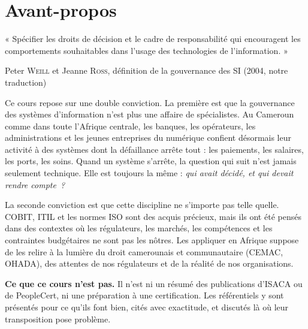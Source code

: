 
\chapter*{Avant-propos}

\epigraph{%
    « Spécifier les droits de décision et le cadre de responsabilité qui
    encouragent les comportements souhaitables dans l'usage des technologies
    de l'information. »%
}{Peter \textsc{Weill} et Jeanne \textsc{Ross}, définition de la
gouvernance des SI (2004, notre traduction)}

\vspace{0.5ex}

Ce cours repose sur une double conviction. La première est que la
gouvernance des systèmes d'information n'est plus une affaire de
spécialistes. Au Cameroun comme dans toute l'Afrique centrale, les banques,
les opérateurs, les administrations et les jeunes entreprises du numérique
confient désormais leur activité à des systèmes dont la défaillance arrête
tout : les paiements, les salaires, les ports, les soins. Quand un système
s'arrête, la question qui suit n'est jamais seulement technique. Elle est
toujours la même : \emph{qui avait décidé, et qui devait rendre compte~?}

La seconde conviction est que cette discipline ne s'importe pas telle
quelle. COBIT, ITIL et les normes ISO sont des acquis précieux, mais ils
ont été pensés dans des contextes où les régulateurs, les marchés, les
compétences et les contraintes budgétaires ne sont pas les nôtres. Les
appliquer en Afrique suppose de les relire à la lumière du droit
camerounais et communautaire (CEMAC, OHADA), des attentes de nos
régulateurs et de la réalité de nos organisations.

\bigskip

\textbf{Ce que ce cours n'est pas.} Il n'est ni un résumé des publications
d'ISACA ou de PeopleCert, ni une préparation à une certification. Les
référentiels y sont présentés pour ce qu'ils font bien, cités avec
exactitude, et discutés là où leur transposition pose problème.

\bigskip

